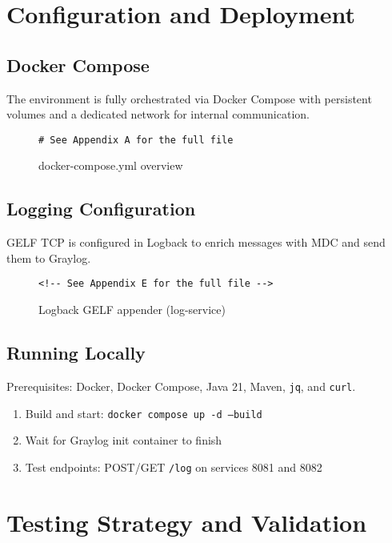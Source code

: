 \documentclass[12pt,a4paper]{report}
\begin{document}
\chapter{Configuration and Deployment}
\section{Docker Compose}
The environment is fully orchestrated via Docker Compose with persistent volumes and a dedicated network for internal communication.

\begin{figure}[H]
\centering
\begin{Verbatim}[frame=single, fontsize=\small, xleftmargin=1cm, xrightmargin=1cm]
# See Appendix A for the full file
\end{Verbatim}
\caption{docker-compose.yml overview}
\label{fig:compose}
\end{figure}

\section{Logging Configuration}
GELF TCP is configured in Logback to enrich messages with MDC and send them to Graylog.

\begin{figure}[H]
\centering
\begin{Verbatim}[frame=single, fontsize=\small, xleftmargin=1cm, xrightmargin=1cm]
<!-- See Appendix E for the full file -->
\end{Verbatim}
\caption{Logback GELF appender (log-service)}
\label{fig:logback}
\end{figure}

\section{Running Locally}
Prerequisites: Docker, Docker Compose, Java 21, Maven, \texttt{jq}, and \texttt{curl}.
\begin{enumerate}
  \item Build and start: \texttt{docker compose up -d --build}
  \item Wait for Graylog init container to finish
  \item Test endpoints: POST/GET \texttt{/log} on services 8081 and 8082
\end{enumerate}

\chapter{Testing Strategy and Validation}
\end{document}
